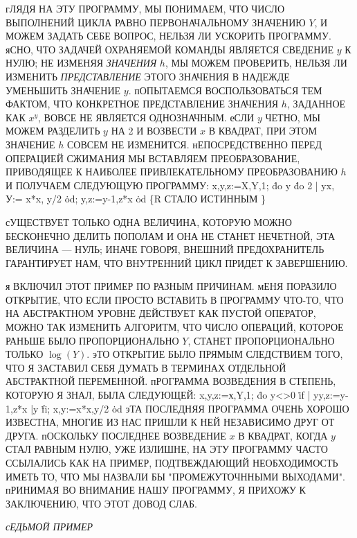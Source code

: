 гЛЯДЯ НА ЭТУ ПРОГРАММУ, МЫ ПОНИМАЕМ, ЧТО ЧИСЛО 
ВЫПОЛНЕНИЙ ЦИКЛА РАВНО ПЕРВОНАЧАЛЬНОМУ ЗНАЧЕНИЮ $Y$, И МОЖЕМ
ЗАДАТЬ СЕБЕ ВОПРОС, НЕЛЬЗЯ ЛИ УСКОРИТЬ ПРОГРАММУ. яСНО, ЧТО
ЗАДАЧЕЙ ОХРАНЯЕМОЙ КОМАНДЫ ЯВЛЯЕТСЯ СВЕДЕНИЕ $y$ К НУЛЮ; НЕ
ИЗМЕНЯЯ \emph{ЗНАЧЕНИЯ} $h$, МЫ МОЖЕМ ПРОВЕРИТЬ, НЕЛЬЗЯ ЛИ ИЗМЕНИТЬ
\emph{ПРЕДСТАВЛЕНИЕ} ЭТОГО ЗНАЧЕНИЯ В НАДЕЖДЕ УМЕНЬШИТЬ ЗНАЧЕНИЕ
$y$. пОПЫТАЕМСЯ ВОСПОЛЬЗОВАТЬСЯ ТЕМ ФАКТОМ, ЧТО КОНКРЕТНОЕ
ПРЕДСТАВЛЕНИЕ ЗНАЧЕНИЯ $h$, ЗАДАННОЕ КАК $x^y$, ВОВСЕ НЕ ЯВЛЯЕТСЯ
ОДНОЗНАЧНЫМ. еСЛИ $y$ ЧЕТНО, МЫ МОЖЕМ РАЗДЕЛИТЬ $y$ НА 2 И
ВОЗВЕСТИ $x$ В КВАДРАТ, ПРИ ЭТОМ ЗНАЧЕНИЕ $h$ СОВСЕМ НЕ ИЗМЕНИТСЯ.
 нЕПОСРЕДСТВЕННО ПЕРЕД ОПЕРАЦИЕЙ СЖИМАНИЯ МЫ ВСТАВЛЯЕМ
ПРЕОБРАЗОВАНИЕ, ПРИВОДЯЩЕЕ К НАИБОЛЕЕ ПРИВЛЕКАТЕЛЬНОМУ
ПРЕОБРАЗОВАНИЮ $h$ И ПОЛУЧАЕМ СЛЕДУЮЩУЮ ПРОГРАММУ:
\prg
x,y,z:=X,Y,1;
\.{do} y \TO \.{do} 2 | y\TO x, У:= x*x, y/2 \.{od};
              y,z:=y-1,z*x
\.{od} \{R СТАЛО ИСТИННЫМ \}
\grp

сУЩЕСТВУЕТ ТОЛЬКО ОДНА ВЕЛИЧИНА, КОТОРУЮ МОЖНО
БЕСКОНЕЧНО ДЕЛИТЬ ПОПОЛАМ И ОНА НЕ СТАНЕТ НЕЧЕТНОЙ, ЭТА
ВЕЛИЧИНА --- НУЛЬ; ИНАЧЕ ГОВОРЯ, ВНЕШНИЙ ПРЕДОХРАНИТЕЛЬ ГАРАНТИРУЕТ
НАМ, ЧТО ВНУТРЕННИЙ ЦИКЛ ПРИДЕТ К ЗАВЕРШЕНИЮ.

я ВКЛЮЧИЛ ЭТОТ ПРИМЕР ПО РАЗНЫМ ПРИЧИНАМ. мЕНЯ 
ПОРАЗИЛО ОТКРЫТИЕ, ЧТО ЕСЛИ ПРОСТО ВСТАВИТЬ В ПРОГРАММУ ЧТО-ТО,
ЧТО НА АБСТРАКТНОМ УРОВНЕ ДЕЙСТВУЕТ КАК ПУСТОЙ ОПЕРАТОР,
МОЖНО ТАК ИЗМЕНИТЬ АЛГОРИТМ, ЧТО ЧИСЛО ОПЕРАЦИЙ, КОТОРОЕ
РАНЬШЕ БЫЛО ПРОПОРЦИОНАЛЬНО $Y$, СТАНЕТ ПРОПОРЦИОНАЛЬНО
ТОЛЬКО $\log (Y)$. эТО ОТКРЫТИЕ БЫЛО ПРЯМЫМ СЛЕДСТВИЕМ ТОГО,
ЧТО Я ЗАСТАВИЛ СЕБЯ ДУМАТЬ В ТЕРМИНАХ ОТДЕЛЬНОЙ АБСТРАКТНОЙ
ПЕРЕМЕННОЙ. пРОГРАММА ВОЗВЕДЕНИЯ В СТЕПЕНЬ, КОТОРУЮ Я ЗНАЛ,
БЫЛА СЛЕДУЮЩЕЙ:
\prg
x,y,z:=х,Y,1;
\.{do} y<>0 \TO \.{if} | y\TO y,z:=y-1,z*x
                       |y \TO{} \.{fi};
                   x,y:=x*x,y/2
\.{od}
\grp
эТА ПОСЛЕДНЯЯ ПРОГРАММА ОЧЕНЬ ХОРОШО ИЗВЕСТНА, МНОГИЕ ИЗ
НАС ПРИШЛИ К НЕЙ НЕЗАВИСИМО ДРУГ ОТ ДРУГА. пОСКОЛЬКУ ПОСЛЕДНЕЕ
ВОЗВЕДЕНИЕ $x$ В КВАДРАТ, КОГДА $y$ СТАЛ РАВНЫМ НУЛЮ, УЖЕ
ИЗЛИШНЕ, НА ЭТУ ПРОГРАММУ ЧАСТО ССЫЛАЛИСЬ КАК НА ПРИМЕР,
ПОДТВЕЖДАЮЩИЙ НЕОБХОДИМОСТЬ ИМЕТЬ ТО, ЧТО МЫ НАЗВАЛИ БЫ
"ПРОМЕЖУТОЧННЫМИ ВЫХОДАМИ". пРИНИМАЯ ВО ВНИМАНИЕ НАШУ
ПРОГРАММУ, Я ПРИХОЖУ К ЗАКЛЮЧЕНИЮ, ЧТО ЭТОТ ДОВОД СЛАБ.

{\sl сЕДЬМОЙ ПРИМЕР }

